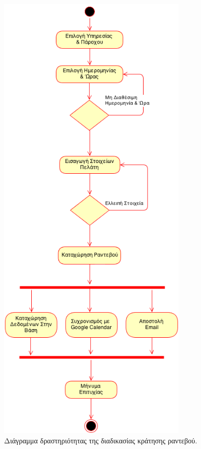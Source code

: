 \begin{figure}
\centering
\includegraphics[width=90mm]{images/ad-book-appointment.png}
\caption{Διάγραμμα δραστηριότητας της διαδικασίας κράτησης ραντεβού.}
\label{ad-book-appointment}
\end{figure}

